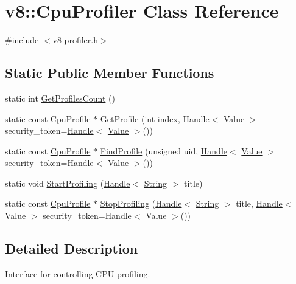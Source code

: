 \hypertarget{classv8_1_1_cpu_profiler}{}\section{v8\+:\+:Cpu\+Profiler Class Reference}
\label{classv8_1_1_cpu_profiler}


{\ttfamily \#include $<$v8-\/profiler.\+h$>$}

\subsection*{Static Public Member Functions}
\begin{DoxyCompactItemize}
\item 
static int \hyperlink{classv8_1_1_cpu_profiler_a44a4ffe2e95237dfeb892972d14d344e}{Get\+Profiles\+Count} ()
\item 
static const \hyperlink{classv8_1_1_cpu_profile}{Cpu\+Profile} $\ast$ \hyperlink{classv8_1_1_cpu_profiler_aca7acdfb0f9a4e7744638dddf97d5ada}{Get\+Profile} (int index, \hyperlink{classv8_1_1_handle}{Handle}$<$ \hyperlink{classv8_1_1_value}{Value} $>$ security\+\_\+token=\hyperlink{classv8_1_1_handle}{Handle}$<$ \hyperlink{classv8_1_1_value}{Value} $>$())
\item 
static const \hyperlink{classv8_1_1_cpu_profile}{Cpu\+Profile} $\ast$ \hyperlink{classv8_1_1_cpu_profiler_a8165ab53a0d9669757e64efd80d4f5d0}{Find\+Profile} (unsigned uid, \hyperlink{classv8_1_1_handle}{Handle}$<$ \hyperlink{classv8_1_1_value}{Value} $>$ security\+\_\+token=\hyperlink{classv8_1_1_handle}{Handle}$<$ \hyperlink{classv8_1_1_value}{Value} $>$())
\item 
static void \hyperlink{classv8_1_1_cpu_profiler_a04c07069ea985ee67a9bcd7a97ab17fc}{Start\+Profiling} (\hyperlink{classv8_1_1_handle}{Handle}$<$ \hyperlink{classv8_1_1_string}{String} $>$ title)
\item 
static const \hyperlink{classv8_1_1_cpu_profile}{Cpu\+Profile} $\ast$ \hyperlink{classv8_1_1_cpu_profiler_ac2702be592e9218e6584f562a9ad7dd8}{Stop\+Profiling} (\hyperlink{classv8_1_1_handle}{Handle}$<$ \hyperlink{classv8_1_1_string}{String} $>$ title, \hyperlink{classv8_1_1_handle}{Handle}$<$ \hyperlink{classv8_1_1_value}{Value} $>$ security\+\_\+token=\hyperlink{classv8_1_1_handle}{Handle}$<$ \hyperlink{classv8_1_1_value}{Value} $>$())
\end{DoxyCompactItemize}


\subsection{Detailed Description}
Interface for controlling C\+P\+U profiling. 

